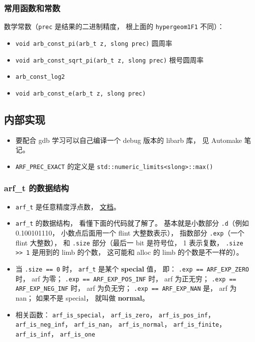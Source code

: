 \subsubsection{常用函数和常数}
数学常数（\verb|prec| 是结果的二进制精度， 根上面的 \verb|hypergeom1F1| 不同）：
\begin{itemize}
\item \verb|void arb_const_pi(arb_t z, slong prec)| 圆周率
\item \verb|void arb_const_sqrt_pi(arb_t z, slong prec)| 根号圆周率
\item \verb|arb_const_log2|
\item \verb|void arb_const_e(arb_t z, slong prec)|
\end{itemize}


\subsection{内部实现}
\begin{itemize}
\item 要配合 gdb 学习可以自己编译一个 debug 版本的 libarb 库， 见 Automake 笔记。
\item \verb|ARF_PREC_EXACT| 的定义是 \verb|std::numeric_limits<slong>::max()|
\end{itemize}

\subsubsection{arf\_t 的数据结构}
\begin{itemize}
\item \verb|arf_t| 是任意精度浮点数， \href{https://arblib.org/arf.html}{文档}。
\item \verb|arf_t| 的数据结构， 看懂下面的代码就了解了。 基本就是小数部分 \verb|.d|（例如 0.100101110， 小数点后面用一个 flint 大整数表示）， 指数部分 \verb|.exp|（一个 flint 大整数）， 和 \verb|.size| 部分（最后一 bit 是符号位， 1 表示复数， \verb|.size >> 1| 是用到的 limb 的个数， 这可能和 alloc 的 limb 的个数是不一样的）。
\item 当 \verb|.size == 0| 时， \verb|arf_t| 是某个 \textbf{special} 值， 即： \verb|.exp == ARF_EXP_ZERO| 时， arf 为零； \verb|.exp == ARF_EXP_POS_INF| 时， arf 为正无穷； \verb|.exp == ARF_EXP_NEG_INF| 时， arf 为负无穷； \verb|.exp == ARF_EXP_NAN| 是， arf 为 nan； 如果不是 special， 就叫做 \textbf{normal}。
\item 相关函数： \verb|arf_is_special|， \verb|arf_is_zero|， \verb|arf_is_pos_inf|， \verb|arf_is_neg_inf|， \verb|arf_is_nan|， \verb|arf_is_normal|， \verb|arf_is_finite|， \verb|arf_is_inf|， \verb|arf_is_one|
\end{itemize}

